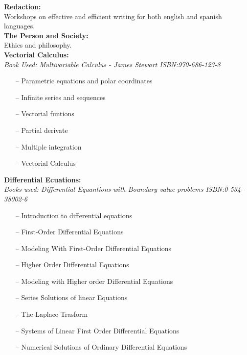 \documentclass{article}
\begin{document}
\textbf{Redaction:}\\
  Workshops on effective and efficient writing for both english and spanish languages.\\


\textbf{The Person and Society:}\\
  Ethics and philosophy.\\


\textbf{Vectorial Calculus:}\\
    \emph{Book Used: Multivariable Calculus - James Stewart ISBN:970-686-123-8}
    \begin{itemize}
     \setlength\itemsep{0pt}
        \item[--]  Parametric equations and polar coordinates
        \item[--]  Infinite series and sequences
        \item[--]  Vectorial funtions
        \item[--]  Partial derivate
        \item[--]  Multiple integration
        \item[--]  Vectorial Calculus
    \end{itemize}

\textbf{Differential Ecuations:}\\
    \emph{Books used: Differential Equantions with Boundary-value problems ISBN:0-534-38002-6}\\
  \begin{itemize}
     \setlength\itemsep{0pt}
      \item[--] Introduction to differential equations
      \item[--] First-Order Differential Equations
      \item[--] Modeling With First-Order Differential Equations
      \item[--] Higher Order Differential Equations
      \item[--] Modeling with Higher order Differential Equations
      \item[--] Series Solutions of linear Equations
      \item[--] The Laplace Trasform
      \item[--] Systems of Linear First Order Differential Equations
      \item[--] Numerical Solutions of Ordinary Differential Equations
  \end{itemize}
\end{document}
